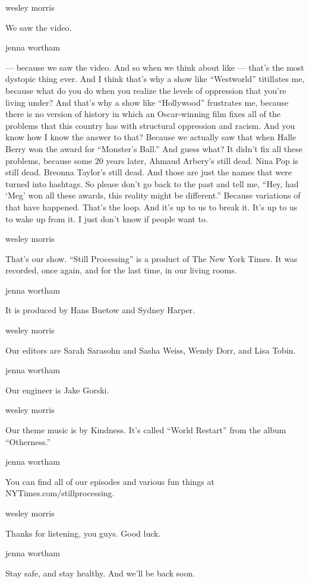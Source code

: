 wesley morris

We saw the video.

jenna wortham

--- because we saw the video. And so when we think about like --- that's
the most dystopic thing ever. And I think that's why a show like
``Westworld'' titillates me, because what do you do when you realize the
levels of oppression that you're living under? And that's why a show
like ``Hollywood'' frustrates me, because there is no version of history
in which an Oscar-winning film fixes all of the problems that this
country has with structural oppression and racism. And you know how I
know the answer to that? Because we actually saw that when Halle Berry
won the award for ``Monster's Ball.'' And guess what? It didn't fix all
these problems, because some 20 years later, Ahmaud Arbery's still dead.
Nina Pop is still dead. Breonna Taylor's still dead. And those are just
the names that were turned into hashtags. So please don't go back to the
past and tell me, ``Hey, had `Meg' won all these awards, this reality
might be different.'' Because variations of that have happened. That's
the loop. And it's up to us to break it. It's up to us to wake up from
it. I just don't know if people want to.

wesley morris

That's our show. ``Still Processing'' is a product of The New York
Times. It was recorded, once again, and for the last time, in our living
rooms.

jenna wortham

It is produced by Hans Buetow and Sydney Harper.

wesley morris

Our editors are Sarah Sarasohn and Sasha Weiss, Wendy Dorr, and Lisa
Tobin.

jenna wortham

Our engineer is Jake Gorski.

wesley morris

Our theme music is by Kindness. It's called ``World Restart'' from the
album ``Otherness.''

jenna wortham

You can find all of our episodes and various fun things at
NYTimes.com/stillprocessing.

wesley morris

Thanks for listening, you guys. Good luck.

jenna wortham

Stay safe, and stay healthy. And we'll be back soon.

